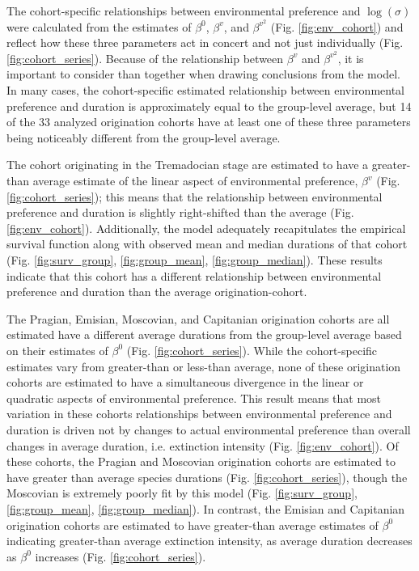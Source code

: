 \documentclass[11pt]{article}
\begin{document}
The cohort-specific relationships between environmental preference and \(\log(\sigma)\) were calculated from the estimates of \(\beta^{0}\), \(\beta^{v}\), and \(\beta^{v^{2}}\) (Fig. \ref{fig:env_cohort}) and reflect how these three parameters act in concert and not just individually (Fig. \ref{fig:cohort_series}). Because of the relationship between \(\beta^{v}\) and \(\beta^{v^{2}}\), it is important to consider than together when drawing conclusions from the model. In many cases, the cohort-specific estimated relationship between environmental preference and duration is approximately equal to the group-level average, but 14 of the 33 analyzed origination cohorts have at least one of these three parameters being noticeably different from the group-level average. 

The cohort originating in the Tremadocian stage are estimated to have a greater-than average estimate of the linear aspect of environmental preference, \(\beta^{v}\) (Fig. \ref{fig:cohort_series}); this means that the relationship between environmental preference and duration is slightly right-shifted than the average (Fig. \ref{fig:env_cohort}). Additionally, the model adequately recapitulates the empirical survival function along with observed mean and median durations of that cohort (Fig. \ref{fig:surv_group}, \ref{fig:group_mean}, \ref{fig:group_median}). These results indicate that this cohort has a different relationship between environmental preference and duration than the average origination-cohort.

The Pragian, Emisian, Moscovian, and Capitanian origination cohorts are all estimated have a different average durations from the group-level average based on their estimates of \(\beta^{0}\) (Fig. \ref{fig:cohort_series}). While the cohort-specific estimates vary from greater-than or less-than average, none of these origination cohorts are estimated to have a simultaneous divergence in the linear or quadratic aspects of environmental preference. This result means that most variation in these cohorts relationships between environmental preference and duration is driven not by changes to actual environmental preference than overall changes in average duration, i.e. extinction intensity (Fig. \ref{fig:env_cohort}). Of these cohorts, the Pragian and Moscovian origination cohorts are estimated to have greater than average species durations (Fig. \ref{fig:cohort_series}), though the Moscovian is extremely poorly fit by this model (Fig. \ref{fig:surv_group}, \ref{fig:group_mean}, \ref{fig:group_median}). In contrast, the Emisian and Capitanian origination cohorts are estimated to have greater-than average estimates of \(\beta^{0}\) indicating greater-than average extinction intensity, as average duration decreases as \(\beta^{0}\) increases (Fig. \ref{fig:cohort_series}). 
\end{document}
